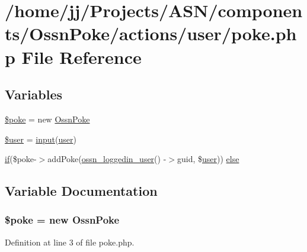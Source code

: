 \hypertarget{actions_2user_2poke_8php}{}\section{/home/jj/\+Projects/\+A\+S\+N/components/\+Ossn\+Poke/actions/user/poke.php File Reference}
\label{actions_2user_2poke_8php}
\subsection*{Variables}
\begin{DoxyCompactItemize}
\item 
\hyperlink{actions_2user_2poke_8php_ac0b38c505fb7b72ef2faab4bb35760a1}{\$poke} = new \hyperlink{class_ossn_poke}{Ossn\+Poke}
\item 
\hyperlink{actions_2user_2poke_8php_a598ca4e71b15a1313ec95f0df1027ca5}{\$user} = \hyperlink{ossn_8lib_8input_8php_a64ebee98b041c4f75f71ed3cd73cc8ed}{input}(\textquotesingle{}\hyperlink{ossn_8config_8db_8example_8php_a802544b7ba9f79bbf24ef67773d53bed}{user}\textquotesingle{})
\item 
\hyperlink{jquery_8tokeninput_8js_ad8dd46a3cbc004569e34401e9e71771a}{if}(\$poke-\/$>$add\+Poke(\hyperlink{ossn_8lib_8users_8php_aa3c8068d0e6638b414d6a2f6c62565b8}{ossn\+\_\+loggedin\+\_\+user}() -\/$>$guid, \$\hyperlink{ossn_8config_8db_8example_8php_a802544b7ba9f79bbf24ef67773d53bed}{user})) \hyperlink{actions_2user_2poke_8php_ad80dd63870ef9c842193e474f23caf1f}{else}
\end{DoxyCompactItemize}


\subsection{Variable Documentation}
\subsubsection[{\texorpdfstring{\$poke}{$poke}}]{\setlength{\rightskip}{0pt plus 5cm}\$poke = new {\bf Ossn\+Poke}}\hypertarget{actions_2user_2poke_8php_ac0b38c505fb7b72ef2faab4bb35760a1}{}\label{actions_2user_2poke_8php_ac0b38c505fb7b72ef2faab4bb35760a1}


Definition at line 3 of file poke.\+php.

